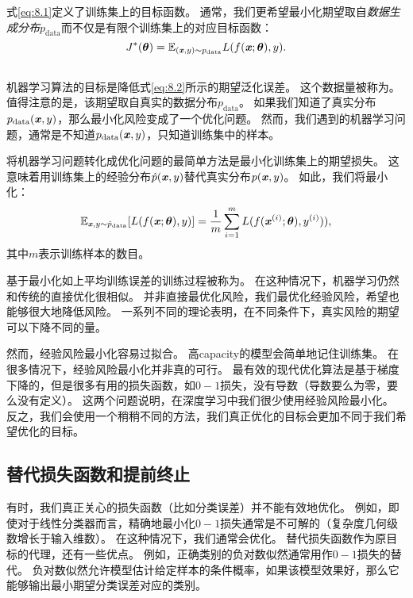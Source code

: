 式\ref{eq:8.1}定义了训练集上的目标函数。
通常，我们更希望最小化期望取自\emph{数据生成分布}$p_{\text{data}}$而不仅是有限个训练集上的对应目标函数：
\begin{equation}
\label{eq:8.2}
    J^*(\boldsymbol{\theta}) = \mathbb{E}_{(\boldsymbol{\mathit{x}}, y) \sim p_\text{data}} L(f(\boldsymbol{\mathit{x}};\boldsymbol{\theta}),y).
\end{equation}

\subsection{}
\label{sec:empirical_risk_minimization}
机器学习算法的目标是降低式\ref{eq:8.2}所示的期望泛化误差。
这个数据量被称为。
值得注意的是，该期望取自真实的数据分布$p_\text{data}$。
如果我们知道了真实分布$p_\text{data}(\boldsymbol{\mathit{x}}, y)$，那么最小化风险变成了一个优化问题。
然而，我们遇到的机器学习问题，通常是不知道$p_\text{data}(\boldsymbol{\mathit{x}}, y)$，只知道训练集中的样本。


将机器学习问题转化成优化问题的最简单方法是最小化训练集上的期望损失。
这意味着用训练集上的经验分布$\hat{p}(\boldsymbol{\mathit{x}},y)$替代真实分布$p(\boldsymbol{\mathit{x}},y)$。
如此，我们将最小化：
\begin{equation}
\label{eq:8.3}
    \mathbb{E}_{\boldsymbol{\mathit{x}}, y \sim \hat{p}_\text{data}} [L(f(\boldsymbol{\mathit{x}}; \boldsymbol{\theta}), y)]
    = \frac{1}{m} \sum_{i=1}^m L( f(\boldsymbol{\mathit{x}}^{(i)}; \boldsymbol{\theta}), y^{(i)}) ),
\end{equation}
其中$m$表示训练样本的数目。

基于最小化如上平均训练误差的训练过程被称为。
在这种情况下，机器学习仍然和传统的直接优化很相似。
并非直接最优化风险，我们最优化经验风险，希望也能够很大地降低风险。
一系列不同的理论表明，在不同条件下，真实风险的期望可以下降不同的量。

然而，经验风险最小化容易过拟合。
高\gls{capacity}的模型会简单地记住训练集。
在很多情况下，经验风险最小化并非真的可行。
最有效的现代优化算法是基于梯度下降的，但是很多有用的损失函数，如$0-1$损失，没有导数（导数要么为零，要么没有定义）。
这两个问题说明，在深度学习中我们很少使用经验风险最小化。
反之，我们会使用一个稍稍不同的方法，我们真正优化的目标会更加不同于我们希望优化的目标。

\subsection{替代损失函数和提前终止}
\label{sec:surrogate_loss_functions_and_early_stopping}
有时，我们真正关心的损失函数（比如分类误差）并不能有效地优化。
例如，即使对于线性分类器而言，精确地最小化$0-1$损失通常是不可解的（复杂度几何级数增长于输入维数）\citep{Marcotte-92}。
在这种情况下，我们通常会优化。
替代损失函数作为原目标的代理，还有一些优点。  
例如，正确类别的负对数似然通常用作$0-1$损失的替代。
负对数似然允许模型估计给定样本的条件概率，如果该模型效果好，那么它能够输出最小期望分类误差对应的类别。

